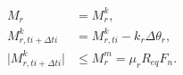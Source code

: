 \begin{equation}
\begin{aligned}
M_r &= M_r^k ,\\
M_{r,ti+\Delta ti}^k &= M_{r,ti}^k - k_r \Delta \theta_r ,\\
\lvert{M_{r,ti+\Delta ti}^k}\rvert & \leq M_r^m = \mu_r R_{eq} F_n .\\
\end{aligned}
 \label{eq:mrtm}
\end{equation}
